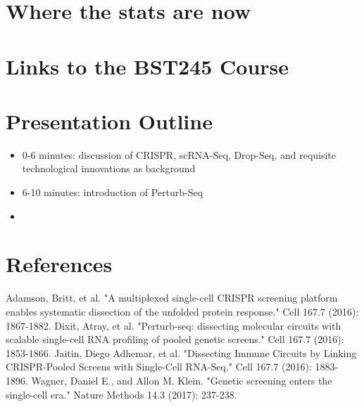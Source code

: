 \documentclass{article}\usepackage[]{graphicx}\usepackage[]{color}
\begin{document}
\section*{Where the stats are now}

\section*{Links to the BST245 Course}

\section*{Presentation Outline}
\begin{itemize}
  \item 0-6 minutes: discussion of CRISPR, scRNA-Seq, Drop-Seq, and requisite technological innovations as background
  \item 6-10 minutes: introduction of Perturb-Seq
  \item 
\end{itemize}


\section*{References}
Adamson, Britt, et al. "A multiplexed single-cell CRISPR screening platform enables systematic dissection of the unfolded protein response." Cell 167.7 (2016): 1867-1882. \newline \newline
Dixit, Atray, et al. "Perturb-seq: dissecting molecular circuits with scalable single-cell RNA profiling of pooled genetic screens." Cell 167.7 (2016): 1853-1866. \newline \newline
Jaitin, Diego Adhemar, et al. "Dissecting Immune Circuits by Linking CRISPR-Pooled Screens with Single-Cell RNA-Seq." Cell 167.7 (2016): 1883-1896. \newline \newline
Wagner, Daniel E., and Allon M. Klein. "Genetic screening enters the single-cell era." Nature Methods 14.3 (2017): 237-238.
\end{document}
